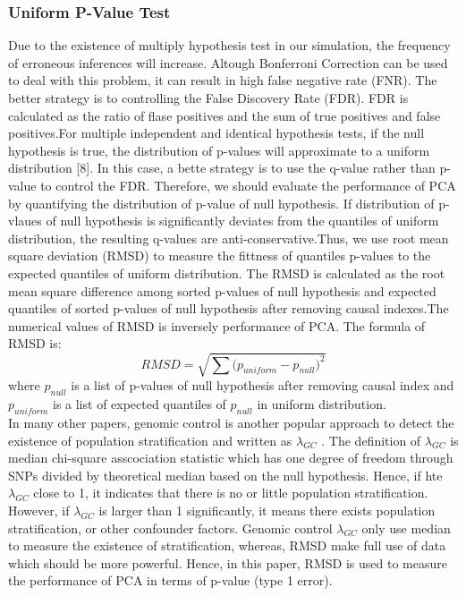 \documentclass[12pt]{article}
\begin{document}
\subsubsection{Uniform P-Value Test }
Due to the existence of multiply hypothesis test in our simulation, the frequency of erroneous inferences will increase. Altough Bonferroni Correction can be used to deal with this problem, it can result in high false negative rate (FNR). The better strategy is to controlling the False Discovery Rate (FDR). FDR is calculated as the ratio of flase positives and the sum of true positives and false positives.For multiple independent and identical hypothesis tests, if the null hypothesis is true, the distribution of p-values will approximate to a uniform distribution [8]. In this case, a bette strategy is to use the q-value rather than p-value to control the FDR. Therefore, we should evaluate the performance of PCA by quantifying the distribution of p-value of null hypothesis. If distribution of p-vlaues of null hypothesis is significantly deviates from the quantiles of uniform distribution, the resulting q-values are anti-conservative.Thus, we use root mean square deviation (RMSD) to measure the fittness of quantiles p-values to the expected quantiles of uniform distribution. The RMSD is calculated as the root mean square difference among sorted p-values of null hypothesis and expected quantiles of sorted p-values of null hypothesis after removing causal indexes.The numerical values of RMSD is inversely  performance of PCA. The formula of RMSD is:
$$RMSD=\sqrt{\sum{(p_{uniform}-p_{null}})^2}$$
where $p_{null}$ is a list of p-values of null hypothesis after removing causal index and $p_{uniform}$ is a list of expected quantiles of $p_{null}$ in uniform distribution. \\

In many other papers, genomic control is another popular approach to detect the existence of population stratification and written as $\lambda_{GC}$ . The definition of $\lambda_{GC}$ is median chi-square asscociation statistic which has one degree of freedom through SNPs divided by theoretical median based on the null hypothesis. Hence, if hte $\lambda_{GC}$ close to 1, it indicates that there is no or little population stratification. However, if $\lambda_{GC}$ is larger than 1 significantly, it means there exists population stratification, or other confounder factors. Genomic control $\lambda_{GC}$ only use median to measure the existence of stratification, whereas, RMSD make full use of data which should be more powerful. Hence, in this paper, RMSD is used to measure the performance of PCA in terms of p-value (type 1 error).
\end{document}
